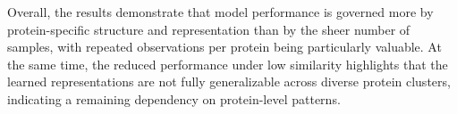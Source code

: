 Overall, the results demonstrate that model performance is governed more by protein-specific structure and representation than by the sheer number of samples, with repeated observations per protein being particularly valuable. At the same time, the reduced performance under low similarity highlights that the learned representations are not fully generalizable across diverse protein clusters, indicating a remaining dependency on protein-level patterns.